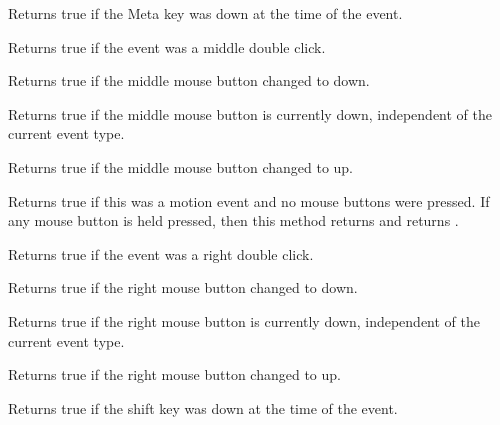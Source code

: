 \label{wxmouseeventmetadown}


Returns true if the Meta key was down at the time of the event.


\label{wxmouseeventmiddledclick}


Returns true if the event was a middle double click.


\label{wxmouseeventmiddledown}


Returns true if the middle mouse button changed to down.


\label{wxmouseeventmiddleisdown}


Returns true if the middle mouse button is currently down, independent
of the current event type.


\label{wxmouseeventmiddleup}


Returns true if the middle mouse button changed to up.


\label{wxmouseeventmoving}


Returns true if this was a motion event and no mouse buttons were pressed. 
If any mouse button is held pressed, then this method returns \false and 
 returns \true.


\label{wxmouseeventrightdclick}


Returns true if the event was a right double click.


\label{wxmouseeventrightdown}


Returns true if the right mouse button changed to down.


\label{wxmouseeventrightisdown}


Returns true if the right mouse button is currently down, independent
of the current event type.


\label{wxmouseeventrightup}


Returns true if the right mouse button changed to up.


\label{wxmouseeventshiftdown}


Returns true if the shift key was down at the time of the event.

